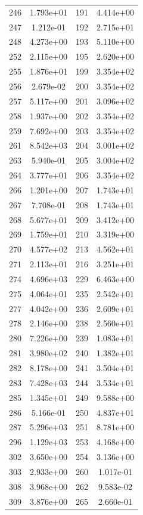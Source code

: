 \documentclass[12pt]{article}
\begin{document}
\begin{longtable}{@{}cccc@{}}
246 & 1.793e+01 & 191 & 4.414e+00 \\
247 & 1.212e-01 & 192 & 2.715e+01 \\
248 & 4.273e+00 & 193 & 5.110e+00 \\
252 & 2.115e+00 & 195 & 2.620e+00 \\
255 & 1.876e+01 & 199 & 3.354e+02 \\
256 & 2.679e-02 & 200 & 3.354e+02 \\
257 & 5.117e+00 & 201 & 3.096e+02 \\
258 & 1.937e+00 & 202 & 3.354e+02 \\
259 & 7.692e+00 & 203 & 3.354e+02 \\
261 & 8.542e+03 & 204 & 3.001e+02 \\
263 & 5.940e-01 & 205 & 3.004e+02 \\
264 & 3.777e+01 & 206 & 3.354e+02 \\
266 & 1.201e+00 & 207 & 1.743e+01 \\
267 & 7.708e-01 & 208 & 1.743e+01 \\
268 & 5.677e+01 & 209 & 3.412e+00 \\
269 & 1.759e+01 & 210 & 3.319e+00 \\
270 & 4.577e+02 & 213 & 4.562e+01 \\
271 & 2.113e+01 & 216 & 3.251e+01 \\
274 & 4.696e+03 & 229 & 6.463e+00 \\
275 & 4.064e+01 & 235 & 2.542e+01 \\
277 & 4.042e+00 & 236 & 2.609e+01 \\
278 & 2.146e+00 & 238 & 2.560e+01 \\
280 & 7.226e+00 & 239 & 1.083e+01 \\
281 & 3.980e+02 & 240 & 1.382e+01 \\
282 & 8.178e+00 & 241 & 3.504e+01 \\
283 & 7.428e+03 & 244 & 3.534e+01 \\
285 & 1.345e+01 & 249 & 9.588e+00 \\
286 & 5.166e-01 & 250 & 4.837e+01 \\
287 & 5.296e+03 & 251 & 8.781e+00 \\
296 & 1.129e+03 & 253 & 4.168e+00 \\
302 & 3.650e+00 & 254 & 3.136e+00 \\
303 & 2.933e+00 & 260 & 1.017e-01 \\
308 & 3.968e+00 & 262 & 9.583e-02 \\
309 & 3.876e+00 & 265 & 2.660e-01 \\

\end{longtable}
\end{document}
